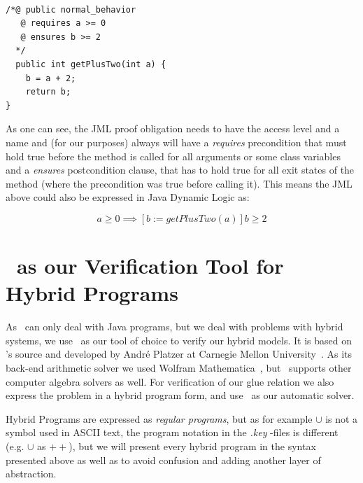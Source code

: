\begin{lstlisting}[label=lst:jml_example]

/*@ public normal_behavior
   @ requires a >= 0
   @ ensures b >= 2
  */
  public int getPlusTwo(int a) {
  	b = a + 2;
  	return b;
}

\end{lstlisting}

As one can see, the JML proof obligation needs to have the access level and a name and (for our purposes) always will have a \textit{requires} precondition that must hold true before the method is called for all arguments or some class variables and a \textit{ensures} postcondition clause, that has to hold true for all exit states of the method (where the precondition was true before calling it). This means the JML above could also be expressed in Java Dynamic Logic as:

\begin{equation}
	a \geq 0 \implies [b := getPlusTwo(a) ] b \geq 2
	\label{eq:jmlddl}
\end{equation}

\section{\keym~as our Verification Tool for Hybrid Programs}
\label{sec:pre:key}

As \key~can only deal with Java programs, but we deal with problems with hybrid systems, we use \keym~as our tool of choice to verify our hybrid models. It is based on \key's source and developed by Andr\'e Platzer at Carnegie Mellon University~\cite{keymaera}. As its back-end arithmetic solver we used Wolfram Mathematica~\cite{mathematica}, but \keym~supports other computer algebra solvers as well. For verification of our glue relation we also express the problem in a hybrid program form, and use \keym~as our automatic solver.

Hybrid Programs are expressed as \textit{regular programs}, but as for example \(\cup\) is not a symbol used in ASCII text, the program notation in the \textit{.key} \keym-files is different (e.g. \(\cup\) as \(++\)), but we will present every hybrid program in the syntax presented above as well as to avoid confusion and adding another layer of abstraction.
